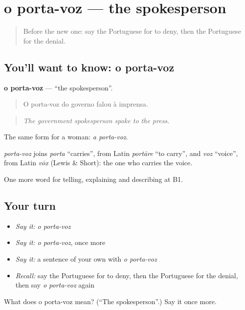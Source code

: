 \section[o porta-voz]{o porta-voz — the spokesperson}

\label{lesson:PT-C283-porta-voz}



\begin{quote}
Before the new one: say the Portuguese for to deny, then the Portuguese for the denial.
\end{quote}

\subsection*{You'll want to know: o porta-voz}
\textbf{o porta-voz} — \textquotedblleft{}the spokesperson\textquotedblright{}.

\begin{quote}
O porta-voz do governo falou à imprensa.
\end{quote}

\begin{quote}
\emph{The government spokesperson spoke to the press.}
\end{quote}

The same form for a woman: \emph{a porta-voz}.

\begin{cousinweb}
\emph{porta-voz} joins \emph{porta} \textquotedblleft{}carries\textquotedblright{}, from Latin \emph{portāre} \textquotedblleft{}to carry\textquotedblright{}, and \emph{voz} \textquotedblleft{}voice\textquotedblright{}, from Latin \emph{vōx} (Lewis \& Short): the one who carries the voice.
\end{cousinweb}

\begin{grammarlens}[title={What you've built}]
One more word for telling, explaining and describing at B1.
\end{grammarlens}

\subsection*{Your turn}
\begin{itemize}
\raggedright
  \item \emph{Say it:} \emph{o porta-voz}
  \item \emph{Say it:} \emph{o porta-voz}, once more
  \item \emph{Say it:} a sentence of your own with \emph{o porta-voz}
  \item \emph{Recall:} say the Portuguese for to deny, then the Portuguese for the denial, then say \emph{o porta-voz} again
\end{itemize}

\begin{tcolorbox}[breakable,colback=teal!4,colframe=teal!35!black,title={Before you move on}]
What does o porta-voz mean? (\textquotedblleft{}The spokesperson\textquotedblright{}.) Say it once more.
\end{tcolorbox}
